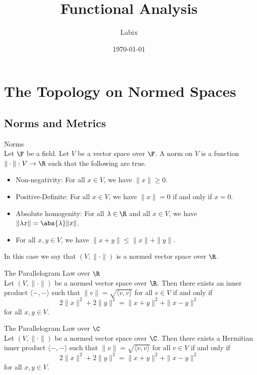 \documentclass[a4paper]{article}
\title{Functional Analysis}
\author{Labix}
\date{\today}
\begin{document}
\maketitle
\begin{abstract}
\end{abstract}
\pagebreak
\tableofcontents

\pagebreak
\section{The Topology on Normed Spaces}
\subsection{Norms and Metrics}
\begin{defn}{Norms}{}\\
Let $\F$ be a field. Let $V$ be a vector space over $\F$. A norm on $V$ is a function $\|\cdot\|:V\to\R$ such that the following are true. 
\begin{itemize}
\item Non-negativity: For all $x\in V$, we have $\|x\|\geq 0$. 
\item Positive-Definite: For all $x\in V$, we have $\|x\|=0$ if and only if $x=0$. 
\item Absolute homogenity: For all $\lambda\in\R$ and all $x\in V$, we have $\|\lambda x\|=\abs{\lambda}\|x\|$. 
\item For all $x,y\in V$, we have $\|x+y\|\leq\|x\|+\|y\|$. 
\end{itemize}
In this case we say that $(V,\|\cdot\|)$ is a normed vector space over $\R$. 
\end{defn}

\begin{thm}{The Parallelogram Law over $\R$}{}\\
Let $(V,\|\cdot\|)$ be a normed vector space over $\R$. Then there exists an inner product $\langle-,-\rangle$ such that $\|v\|=\sqrt{\langle v,v\rangle}$ for all $v\in V$ if and only if $$2\|x\|^2+2\|y\|^2=\|x+y\|^2+\|x-y\|^2$$ for all $x,y\in V$. 
\end{thm}

\begin{thm}{The Parallelogram Law over $\C$}{}\\
Let $(V,\|\cdot\|)$ be a normed vector space over $\C$. Then there exists a Hermitian inner product $\langle-,-\rangle$ such that $\|v\|=\sqrt{\langle v,v\rangle}$ for all $v\in V$ if and only if $$2\|x\|^2+2\|y\|^2=\|x+y\|^2+\|x-y\|^2$$ for all $x,y\in V$. 
\end{thm}
\end{document}
